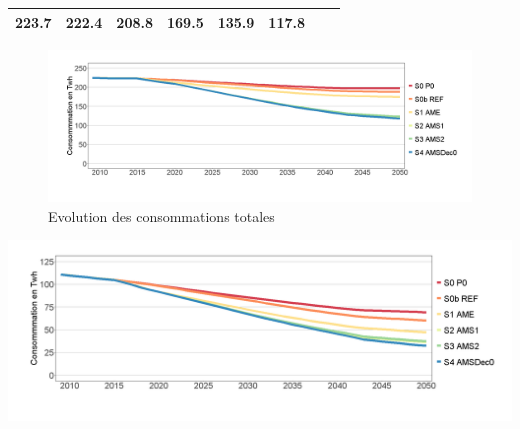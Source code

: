 \documentclass[]{article}
\begin{document}
\begin{longtable}[]{@{}llrrrrrr@{}}
\begin{minipage}[t]{0.09\columnwidth}
223.7\strut
\end{minipage} & \begin{minipage}[t]{0.09\columnwidth}\raggedleft\strut
222.4\strut
\end{minipage} & \begin{minipage}[t]{0.09\columnwidth}\raggedleft\strut
208.8\strut
\end{minipage} & \begin{minipage}[t]{0.09\columnwidth}\raggedleft\strut
169.5\strut
\end{minipage} & \begin{minipage}[t]{0.09\columnwidth}\raggedleft\strut
135.9\strut
\end{minipage} & \begin{minipage}[t]{0.09\columnwidth}\raggedleft\strut
117.8\strut
\end{minipage}\tabularnewline
\bottomrule
\end{longtable}

\begin{figure}
\centering
\includegraphics{Exemple_sortiestertiaire_files/figure-latex/Evol_Conso_tot-1.png}
\caption{Evolution des consommations totales}
\end{figure}

\includegraphics{Exemple_sortiestertiaire_files/figure-latex/Evol_Conso_chauffage-1.png}
\pagebreak
\end{document}
